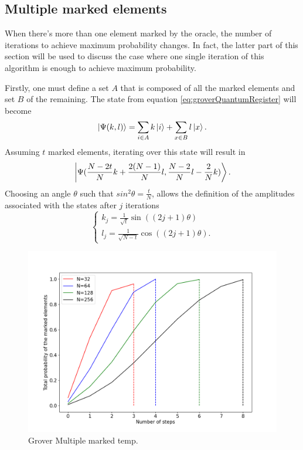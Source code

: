 \documentclass[../../dissertation.tex]{subfiles}
\begin{document}
\subsection{Multiple marked elements}
When there's more than one element marked by the oracle, the number of iterations to achieve maximum probability changes. In fact, the latter part of this section will be used to discuss the case where one single iteration of this algorithm is enough to achieve maximum probability.\par
Firstly, one must define a set $A$ that is composed of all the marked elements and set $B$ of the remaining. The state from equation \ref{eq:groverQuantumRegister} will become
\begin{equation}
	\ket{\Psi(k,l)} =\sum_{i\in A} k\ket{i} + \sum_{x \in B}l\ket{x}.
\end{equation}
Assuming $t$ marked elements, iterating over this state will result in
\begin{equation}
	\ket{\Psi(\frac{N-2t}{N}k + \frac{2(N-1)}{N}l, \frac{N-2}{N}l - \frac{2}{N}k)}.
\end{equation}
Choosing an angle $\theta$ such that $sin^2\theta=\frac{t}{N}$, allows the definition of the amplitudes associated with the states after $j$ iterations 
\begin{equation}
	\begin{cases}
		k_{j} =\frac{1}{\sqrt{t}} \sin{((2j+1)\theta)} 
		\\l_{j} = \frac{1}{\sqrt{N-t}}\cos{((2j+1)\theta)}.
	\end{cases}\label{eq:groverKandJ2}
\end{equation}
\begin{figure}[h]
	\centering
	\includegraphics[scale=0.40]{img/Grover/GroverMultipleMarked3264128256}
	\caption{Grover Multiple marked temp.} 
	\label{fig:groverMultipleMarked3264128256}
\end{figure}
\end{document}

